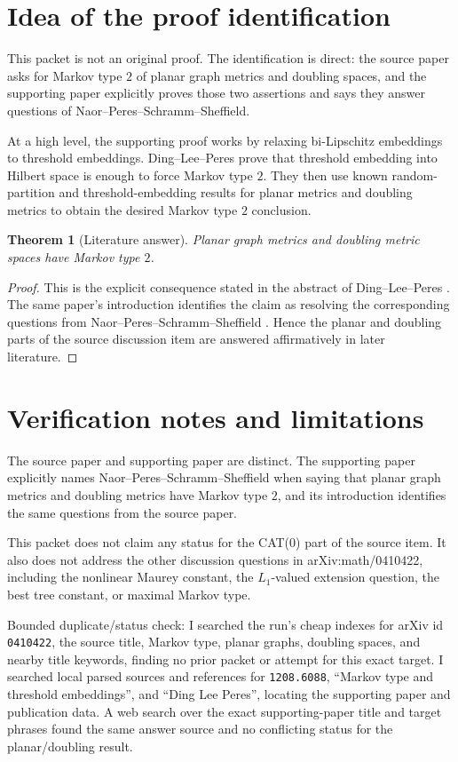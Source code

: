 \documentclass[11pt]{article}
\newtheorem{theorem}{Theorem}
\newcommand{\NPSS}{Naor--Peres--Schramm--Sheffield}
\begin{document}
\section*{Idea of the proof identification}

This packet is not an original proof.  The identification is direct: the source
paper asks for Markov type \(2\) of planar graph metrics and doubling spaces,
and the supporting paper explicitly proves those two assertions and says they
answer questions of \NPSS{}.

At a high level, the supporting proof works by relaxing bi-Lipschitz embeddings
to threshold embeddings.  Ding--Lee--Peres prove that threshold embedding into
Hilbert space is enough to force Markov type \(2\).  They then use known
random-partition and threshold-embedding results for planar metrics and
doubling metrics to obtain the desired Markov type \(2\) conclusion.

\begin{theorem}[Literature answer]
Planar graph metrics and doubling metric spaces have Markov type \(2\).
\end{theorem}

\begin{proof}
This is the explicit consequence stated in the abstract of Ding--Lee--Peres
\cite{DingLeePeresThreshold}.  The same paper's introduction identifies the
claim as resolving the corresponding questions from \NPSS{}
\cite{NaorPeresSchrammSheffieldMarkov}.  Hence the planar and doubling parts
of the source discussion item are answered affirmatively in later literature.
\end{proof}

\section*{Verification notes and limitations}

The source paper and supporting paper are distinct.  The supporting paper
explicitly names \NPSS{} when saying that planar graph metrics and doubling
metrics have Markov type \(2\), and its introduction identifies the same
questions from the source paper.

This packet does not claim any status for the CAT(0) part of the source item.
It also does not address the other discussion questions in arXiv:math/0410422,
including the nonlinear Maurey constant, the \(L_1\)-valued extension question,
the best tree constant, or maximal Markov type.

Bounded duplicate/status check: I searched the run's cheap indexes for
arXiv id \texttt{0410422}, the source title, Markov type, planar graphs,
doubling spaces, and nearby title keywords, finding no prior packet or
attempt for this exact target.  I searched local parsed sources and references
for \texttt{1208.6088}, ``Markov type and threshold embeddings'', and
``Ding Lee Peres'', locating the supporting paper and publication data.  A web
search over the exact supporting-paper title and target phrases found the same
answer source and no conflicting status for the planar/doubling result.
\end{document}
